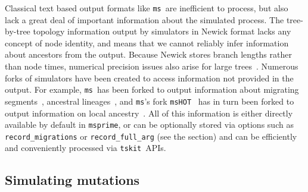 \documentclass[9pt,twocolumn,twoside,lineno]{gsajnl}
\newcommand{\msprime}[0]{\texttt{msprime}}
\newcommand{\tskit}[0]{\texttt{tskit}}
\newcommand{\ms}[0]{\texttt{ms}}
\newcommand{\msHOT}[0]{\texttt{msHOT}}
\begin{document}
Classical text based output formats like \ms\ are inefficient to process,
but also lack a great deal of important information about the simulated
process.
The tree-by-tree topology information output by simulators in Newick
format lacks any concept of node identity,
and means that we cannot reliably infer information about ancestors
from the output. Because Newick stores branch lengths rather
than node times, numerical precision issues also arise for
large trees~\citep{mcgill2013graphml}.
Numerous forks  of simulators have been created to access information not provided
in the output. For example, \ms\  has been forked to
output information about migrating segments~\citep{rosenzweig2016powerful},
ancestral lineages~\citep{chen2013asymptotic},
and \ms's fork \msHOT~\citep{hellenthal2007mshot}
has in turn been forked to output information on local
ancestry~\citep{racimo2017archaic}.
All of this information
is either directly available by default in \msprime, or can be optionally
stored via options such as \texttt{record\_migrations} or
\texttt{record\_full\_arg} (see the  section) and
can be efficiently and conveniently processed via \tskit\ APIs.


\subsection*{Simulating mutations}
\label{sec-mutations}
\end{document}
